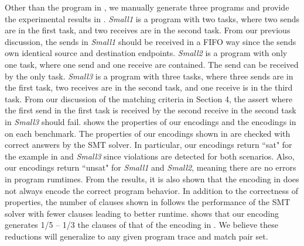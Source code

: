 Other than the program in , we manually generate three programs and provide the experimental results in . \textit{Small1} is a program with two tasks, where two sends are in the first task, and two receives are in the second task. From our previous discussion, the sends in \textit{Small1} should be received in a FIFO way since the sends own identical source and destination endpoints. \textit{Small2} is a program with only one task, where one send and one receive are contained. The send can be received by the only task. \textit{Small3} is a program with three tasks, where three sends are in the first task, two receives are in the second task, and one receive is in the third task. From our discussion of the matching criteria in Section 4, the assert where the first send in the first task is received by the second receive in the second task in \textit{Small3} should fail.  shows the properties of our encodings and the encodings in \cite{elwakil:padtad10} on each benchmark. The properties of our encodings shown in  are checked with correct answers by the SMT solver. In particular, our encodings return ``sat" for the example in  and \textit{Small3} since violations are detected for both scenarios. Also, our encodings return ``unsat" for \textit{Small1} and \textit{Small2}, meaning there are no errors in program rumtimes. From the results, it is also shown that the encoding in \cite{elwakil:padtad10} does not always encode the correct program behavior. In addition to the correctness of properties, the number of clauses shown in  follows the performance of the SMT solver with fewer clauses leading to better runtime.  shows that our encoding generates  1/5 -- 1/3  the clauses of that of the encoding in \cite{elwakil:padtad10}. We believe these reductions will generalize to any given program trace and match pair set.

